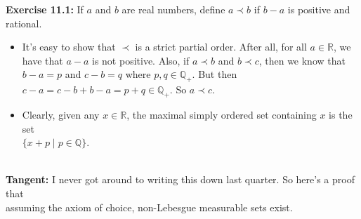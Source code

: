 \documentclass{book}
\newcommand{\pracOne}{
   \color{BrickRed}%
   \fontsize{13}{15}\selectfont%
}
\newcommand{\exOne}{%
   \color{Purple}%
   \fontsize{14}{16}\selectfont%
}
\newcommand{\exTwo}{%
\color{Purple}%
   \fontsize{13}{15}\selectfont%
}
\newcommand{\blab}[1]{\textbf{#1}}
\newcommand{\mySepTwo}[1][.]{%
   {\noindent\color{#1}{\rule{6.5in}{0.5mm}}}\\%
}
\newcommand{\retTwo}{\hfill\bigbreak}
\begin{document}
   \exOne\blab{Exercise 11.1:} If $a$ and $b$ are real numbers, define $a \prec b$ if $b - a$ is positive and rational. 
   \begin{itemize}\exTwo
      \item It's easy to show that $\prec$ is a strict partial order. After all, for all $a \in \mathbb{R}$, we have that $a - a$ is not positive. Also, if $a \prec b$ and $b \prec c$, then we know that $b - a = p$ and $c - b = q$ where $p, q \in \mathbb{Q}_+$. But then $c - a = c - b + b - a = p + q \in \mathbb{Q}_+$. So $a \prec c$.\retTwo
      \item Clearly, given any $x \in \mathbb{R}$, the maximal simply ordered set containing $x$ is the set\\ $\{x + p \mid p \in \mathbb{Q}\}$.\newpage
   \end{itemize}

   \pracOne\mySepTwo

   \blab{Tangent:} I never got around to writing this down last quarter. So here's a proof that\\ assuming the axiom of choice, non-Lebesgue measurable sets exist.
   
\end{document}
